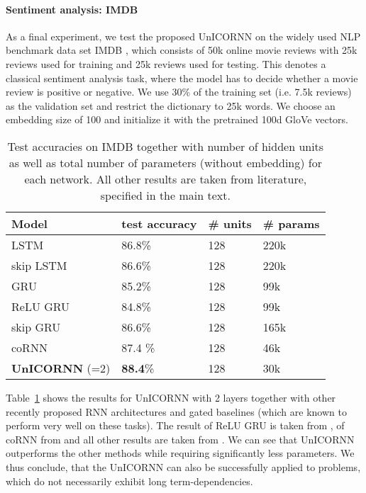 \documentclass[a4paper]{article}
\newcommand{\Tref}[1]{Table~\ref{#1}}
\begin{document}
\paragraph{Sentiment analysis: IMDB}
As a final experiment, we test the proposed UnICORNN on the widely used NLP benchmark data set IMDB \citep{imdb}, which consists of 50k online movie reviews with 25k reviews used for training and 25k reviews used for testing. This denotes a classical sentiment analysis task, where the model has to decide whether a movie review is positive or negative. We use 30\% of the training set (i.e. 7.5k reviews) as the validation set and restrict the dictionary to 25k words. We choose an embedding size of 100 and initialize it with the pretrained 100d GloVe \cite{glove} vectors.
\begin{table}[h!]
  \caption{Test accuracies on IMDB together with number of hidden units as well as total number of parameters (without embedding) for each network. All other results are taken from literature, specified in the main text.}
  \label{tab:imdb}
  \centering
  \begin{tabular}{llll}
    \toprule
    \cmidrule(r){1-4}
    { Model} &  test accuracy & \# units & { \# params} \\
    \midrule
LSTM&  86.8\% & 128 & 220k\\
skip LSTM & 86.6\% & 128 & 220k \\
GRU & 85.2\% & 128 & 99k\\
ReLU GRU & 84.8\% & 128 & 99k \\
skip GRU & 86.6\% & 128 & 165k\\
coRNN & 87.4 \% &128 & 46k \\
\textbf{UnICORNN} (=2) & \textbf{88.4}\% & 128 & 30k\\
    \bottomrule
  \end{tabular}
\end{table}

\Tref{tab:imdb} shows the results for UnICORNN with 2 layers together with other recently proposed RNN architectures and gated baselines (which are known to perform very well on these tasks). The result of ReLU GRU is taken from \cite{imdb_gru}, of coRNN from \cite{coRNN} and all other results are taken from \cite{imdb_base}. We can see that UnICORNN outperforms the other methods while requiring significantly less parameters. We thus conclude, that the UnICORNN can also be successfully applied to problems, which do not necessarily exhibit long term-dependencies.
\end{document}
